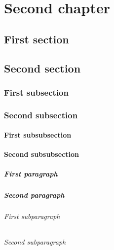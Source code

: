 \documentclass[nocopyright,baselinegrid]{uit-thesis-test}
\begin{document}
\chapter{Second chapter}
\section{First section}
\section{Second section}
\subsection{First subsection}
\subsection{Second subsection}
\subsubsection{First subsubsection}
\subsubsection{Second subsubsection}
\paragraph{First paragraph}
\paragraph{Second paragraph}
\subparagraph{First subparagraph}
\subparagraph{Second subparagraph}
\end{document}
